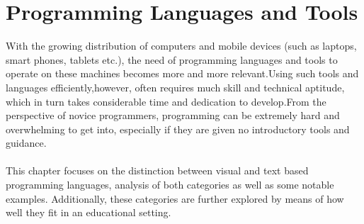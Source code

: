 \chapter{Programming Languages and Tools}
\label{chap:languages_and_tools}

With the growing distribution of computers and mobile devices (such as laptops, smart phones, tablets etc.), the need of programming languages and tools to operate on these machines becomes more and more relevant.Using such tools and languages efficiently,however, often requires much skill and technical aptitude, which in turn takes considerable time and dedication to develop.From the perspective of novice programmers, programming can be extremely hard and overwhelming to get into, especially if they are given no introductory tools and guidance.\\\\
This chapter focuses on the distinction between visual and text based programming languages, analysis of both categories as well as some notable examples. Additionally, these categories are further explored by means of how well they fit in an educational setting.   
	


